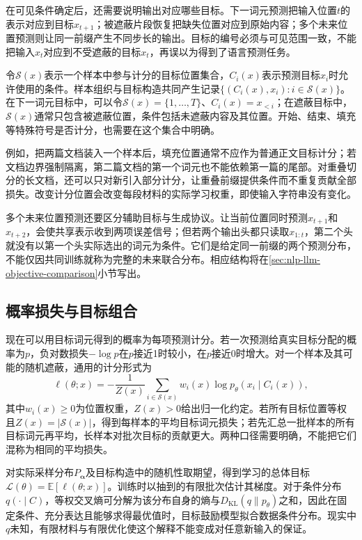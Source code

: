 在可见条件确定后，还需要说明输出对应哪些目标。下一词元预测把输入位置$t$的表示对应到目标$x_{t+1}$；被遮蔽片段恢复把缺失位置对应到原始内容；多个未来位置预测则让同一前缀产生不同步长的输出。目标的编号必须与可见范围一致，不能把输入$x_t$对应到不受遮蔽的目标$x_t$，再误以为得到了语言预测任务。

令$\mathcal S(x)$表示一个样本中参与计分的目标位置集合，$C_i(x)$表示预测目标$x_i$时允许使用的条件。样本组织与目标构造共同产生记录$\{(C_i(x),x_i):i\in\mathcal S(x)\}$。在下一词元目标中，可以令$\mathcal S(x)=\{1,\ldots,T\}$、$C_i(x)=x_{<i}$；在遮蔽目标中，$\mathcal S(x)$通常只包含被遮蔽位置，条件包括未遮蔽内容及其位置。开始、结束、填充等特殊符号是否计分，也需要在这个集合中明确。

例如，把两篇文档装入一个样本后，填充位置通常不应作为普通正文目标计分；若文档边界强制隔离，第二篇文档的第一个词元也不能依赖第一篇的尾部。对重叠切分的长文档，还可以只对新引入部分计分，让重叠前缀提供条件而不重复贡献全部损失。改变计分位置会改变每段材料的实际学习权重，即使输入字符串没有变化。

多个未来位置预测还要区分辅助目标与生成协议。让当前位置同时预测$x_{t+1}$和$x_{t+2}$，会使共享表示收到两项误差信号；但若两个输出头都只读取$x_{1:t}$，第二个头就没有以第一个头实际选出的词元为条件。它们是给定同一前缀的两个预测分布，不能仅因共同训练就称为完整的未来联合分布。相应结构将在\ref{sec:nlp-llm-objective-comparison}小节写出。

\subsection{概率损失与目标组合}
\label{sec:nlp-llm-objective-loss}

现在可以用目标词元得到的概率为每项预测计分。若一次预测给真实目标分配的概率为$p$，负对数损失$-\log p$在$p$接近1时较小，在$p$接近0时增大。对一个样本及其可能的随机遮蔽，通用的计分形式为
\begin{equation}
 \ell(\theta;x)=
 -\frac{1}{Z(x)}\sum_{i\in\mathcal S(x)}
 w_i(x)\log p_\theta(x_i\mid C_i(x)),
 \label{eq:nlp-llm-objective-general}
\end{equation}
其中$w_i(x)\geq0$为位置权重，$Z(x)>0$给出归一化约定。若所有目标位置等权且$Z(x)=|\mathcal S(x)|$，得到每样本的平均目标词元损失；若先汇总一批样本的所有目标词元再平均，长样本对批次目标的贡献更大。两种口径需要明确，不能把它们混称为相同的平均损失。

对实际采样分布$P_{\bm\alpha}$及目标构造中的随机性取期望，得到学习的总体目标$\mathcal L(\theta)=\mathbb E[\ell(\theta;x)]$。训练时以抽到的有限批次估计其梯度。对于条件分布$q(\cdot\mid C)$，等权交叉熵可分解为该分布自身的熵与$D_{\mathrm{KL}}(q\|p_\theta)$之和，因此在固定条件、充分表达且能够求得最优值时，目标鼓励模型拟合数据条件分布。现实中$q$未知，有限材料与有限优化使这个解释不能变成对任意新输入的保证。


